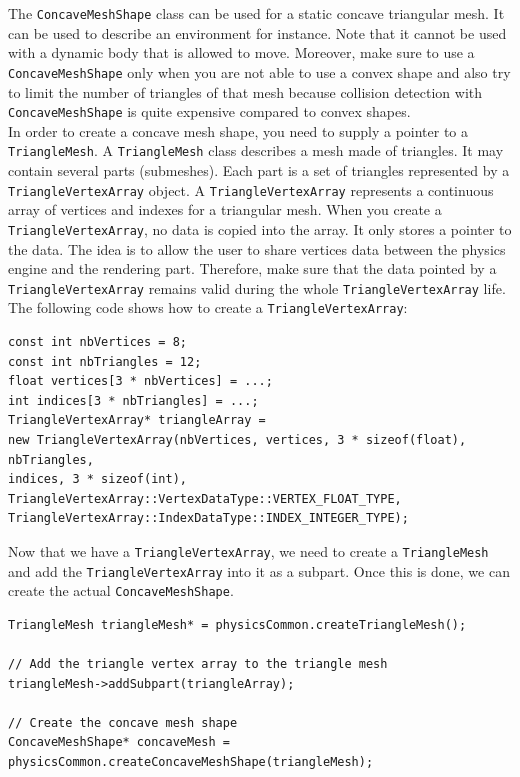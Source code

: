 \documentclass[a4paper,12pt]{article}
\begin{document}
  The \texttt{ConcaveMeshShape} class can be used for a static concave triangular mesh. It can be used to describe an environment for
  instance. Note that it cannot be used with a dynamic body that is allowed to move. Moreover, make sure to use a \texttt{ConcaveMeshShape} only
  when you are not able to use a convex shape and also try to limit the number of triangles of that mesh because collision detection
  with \texttt{ConcaveMeshShape} is quite expensive compared to convex shapes. \\

  In order to create a concave mesh shape, you need to supply a pointer to a \texttt{TriangleMesh}. A \texttt{TriangleMesh} class
  describes a mesh made of triangles. It may contain several parts (submeshes). Each part is a set of
  triangles represented by a \texttt{TriangleVertexArray} object. A \texttt{TriangleVertexArray} represents
  a continuous array of vertices and indexes for a triangular mesh. When you create a \texttt{TriangleVertex\allowbreak Array}, no data is copied
  into the array. It only stores a pointer to the data. The idea is to allow the user to share vertices data between the physics engine and the rendering
  part. Therefore, make sure that the data pointed by a \texttt{TriangleVertexArray} remains valid during the whole \texttt{TriangleVertexArray} life.
  \\

  The following code shows how to create a \texttt{TriangleVertexArray}: \\

  \begin{lstlisting}
const int nbVertices = 8;
const int nbTriangles = 12;
float vertices[3 * nbVertices] = ...;
int indices[3 * nbTriangles] = ...;
TriangleVertexArray* triangleArray =
new TriangleVertexArray(nbVertices, vertices, 3 * sizeof(float), nbTriangles,
indices, 3 * sizeof(int),
TriangleVertexArray::VertexDataType::VERTEX_FLOAT_TYPE,
TriangleVertexArray::IndexDataType::INDEX_INTEGER_TYPE);
  \end{lstlisting}

  \vspace{0.6cm}

  Now that we have a \texttt{TriangleVertexArray}, we need to create a \texttt{TriangleMesh} and add the \texttt{TriangleVertexArray}
  into it as a subpart. Once this is done, we can create the actual \texttt{ConcaveMeshShape}. \\

  \begin{lstlisting}
TriangleMesh triangleMesh* = physicsCommon.createTriangleMesh();

// Add the triangle vertex array to the triangle mesh
triangleMesh->addSubpart(triangleArray);

// Create the concave mesh shape
ConcaveMeshShape* concaveMesh = physicsCommon.createConcaveMeshShape(triangleMesh);
  \end{lstlisting}
\end{document}
